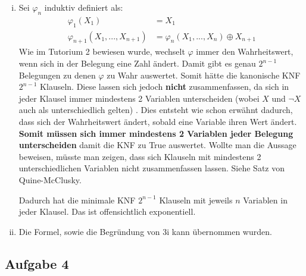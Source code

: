 \documentclass[a4paper,10pt]{article}
\begin{document}
\begin{enumerate}[(i)]
\item Sei $\varphi_n$ induktiv definiert als:
\begin{align*}
\varphi_1(X_1) &= X_1 \\
\varphi_{n+1}(X_1,...,X_{n+1}) &= \varphi_n(X_1,...,X_n) \oplus X_{n+1}
\end{align*}
Wie im Tutorium 2 bewiesen wurde, wechselt $\varphi$ immer den Wahrheitswert, wenn sich in der Belegung eine Zahl ändert. Damit gibt es genau $2^{n-1}$ Belegungen zu denen $\varphi$ zu Wahr auswertet. Somit hätte die kanonische KNF $2^{n-1}$ Klauseln. Diese lassen sich jedoch \textbf{nicht} zusammenfassen, da sich in jeder Klausel immer mindestens 2 Variablen unterscheiden (wobei $X$ und $\lnot X$ auch als unterschiedlich gelten) . Dies entsteht wie schon erwähnt dadurch, dass sich der Wahrheitswert ändert, sobald eine Variable ihren Wert ändert. \textbf{Somit müssen sich immer mindestens 2 Variablen jeder Belegung unterscheiden} damit die KNF zu \textsf{True} auswertet. Wollte man die Aussage beweisen, müsste man zeigen, dass sich Klauseln mit mindestens 2 unterschiedlichen Variablen nicht zusammenfassen lassen. Siehe Satz von Quine-McClusky.

 Dadurch hat die minimale KNF $2^{n-1}$ Klauseln mit jeweils $n$ Variablen in jeder Klausel. Das ist offensichtlich exponentiell.

\item Die Formel, sowie die Begründung von 3i kann übernommen wurden.


\end{enumerate}

\subsection*{Aufgabe 4}
\end{document}
